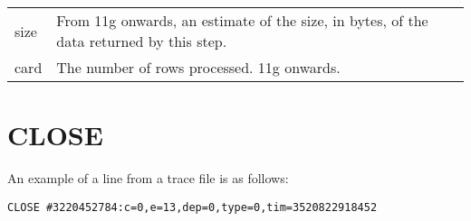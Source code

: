 \begin{longtable}[]{@{}l|l@{}}
\begin{minipage}[t]{0.14\columnwidth}
size\strut
\end{minipage} & \begin{minipage}[t]{0.65\columnwidth}\raggedright\strut
From 11g onwards, an estimate of the size, in bytes, of the data returned by
this step.\strut
\end{minipage}\tabularnewline
\begin{minipage}[t]{0.14\columnwidth}\raggedright\strut
card\strut
\end{minipage} & \begin{minipage}[t]{0.65\columnwidth}\raggedright\strut
The number of rows processed. 11g onwards.\strut
\end{minipage}\tabularnewline
\bottomrule
\end{longtable}

\newpage\section{CLOSE}\label{close}

An example of a  line from a trace file is as follows:

\begin{lstlisting}[numbers=none,caption={Close Line}]
CLOSE #3220452784:c=0,e=13,dep=0,type=0,tim=3520822918452
\end{lstlisting}

